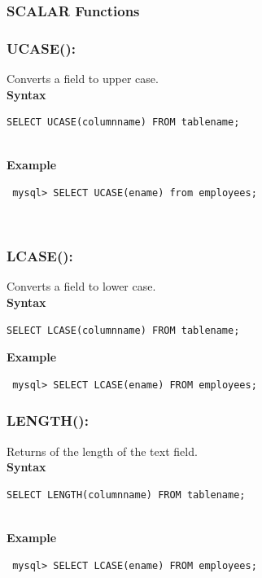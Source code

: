 \documentclass[11pt,a4paper]{article}
\begin{document}
\subsubsection*{SCALAR Functions}

\subsubsection*{UCASE():} Converts a field to upper case.\\

\textbf{Syntax}\\
\begin{verbatim}SELECT UCASE(columnname) FROM tablename; \end{verbatim}\\

\textbf{Example}
\begin{verbatim} mysql> SELECT UCASE(ename) from employees; \end{verbatim}\\

\subsubsection*{LCASE():} Converts a field to lower case.\\

\textbf{Syntax}
\begin{verbatim}SELECT LCASE(columnname) FROM tablename; \end{verbatim}

\textbf{Example}
\begin{verbatim} mysql> SELECT LCASE(ename) FROM employees; \end{verbatim}

\subsubsection*{LENGTH():} Returns of the length of the text field.\\

\textbf{Syntax}\\
\begin{verbatim}SELECT LENGTH(columnname) FROM tablename; \end{verbatim}\\

\textbf{Example}
\begin{verbatim} mysql> SELECT LCASE(ename) FROM employees; \end{verbatim}\\
\end{document}
